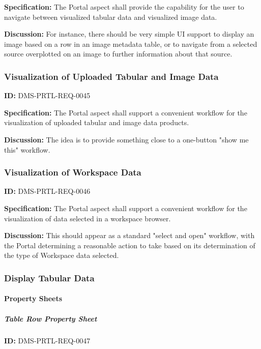 \documentclass[SE,toc,lsstdraft]{lsstdoc}
\begin{document}
\textbf{Specification:}
The Portal aspect shall provide the capability for the user to navigate between visualized tabular data and visualized image data.

\textbf{Discussion:}
For instance, there should be very simple UI support to display an image based on a row in an image metadata table, or to navigate from a selected source overplotted on an image to further information about that source.

\subsubsection{Visualization of Uploaded Tabular and Image Data}

\label{DMS-PRTL-REQ-0045}
\textbf{ID:} DMS-PRTL-REQ-0045

\textbf{Specification:}
The Portal aspect shall support a convenient workflow for the visualization of uploaded tabular and image data products.

\textbf{Discussion:}
The idea is to provide something close to a one-button "show me this" workflow.

\subsubsection{Visualization of Workspace Data}

\label{DMS-PRTL-REQ-0046}
\textbf{ID:} DMS-PRTL-REQ-0046

\textbf{Specification:}
The Portal aspect shall support a convenient workflow for the visualization of data selected in a workspace browser.

\textbf{Discussion:}
This should appear as a standard "select and open" workflow, with the Portal determining a reasonable action to take based on its determination of the type of Workspace data selected.

\subsubsection{Display Tabular Data}

\paragraph{Property Sheets}\hfill  %

\subparagraph{Table Row Property Sheet}\hfill  %

\label{DMS-PRTL-REQ-0047}
\textbf{ID:} DMS-PRTL-REQ-0047
\end{document}
